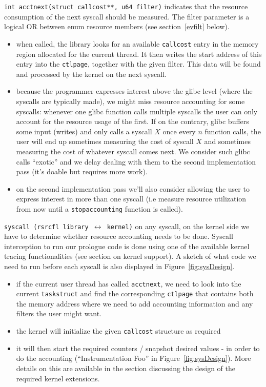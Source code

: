 \documentclass[12pt]{article}
\def\_{\textunderscore\-}
\begin{document}
{\color{blue}\texttt{int acct\_next(struct call\_cost**, u64 filter)}} indicates that the resource consumption of the next syscall should be measured. The filter parameter is a logical \textsc{OR} between enum resource members (see section~\ref{evfilt} below).
\begin{itemize}
\item when called, the library looks for an available \texttt{call\_cost} entry in the memory region allocated for the current thread. It then writes the start address of this entry into the \texttt{ctl\_page}, together with the given filter. This data will be found and processed by the kernel on the next syscall. 
\item because the programmer expresses interest above the glibc level (where the syscalls are typically made), we might miss resource accounting for some syscalls: whenever one glibc function calls multiple syscalls the user can only account for the resource usage of the first. If on the contrary, glibc buffers some input (writes) and only calls a syscall $X$ once every $n$ function calls, the user will end up sometimes measuring the cost of syscall $X$ and sometimes measuring the cost of whatever syscall comes next. We consider such glibc calls ``exotic'' and we delay dealing with them to the second implementation pass (it’s doable but requires more work).
\item on the second implementation pass we’ll also consider allowing the user to express interest in more than one syscall (i.e measure resource utilization from now until a \texttt{stop\_accounting} function is called). 
\end{itemize}

{\color{red}\texttt{syscall (rsrcfl library $\longleftrightarrow$ kernel)}} on any syscall, on the kernel side we have to determine whether resource accounting needs to be done. Syscall interception to run our prologue code is done using one of the available kernel tracing functionalities (see section on kernel support). A sketch of what code we need to run before each syscall is also displayed in Figure~\ref{fig:sysDesign}.
\begin{itemize}
\item if the current user thread has called \texttt{acct\_next}, we need to look into the current \texttt{task\_struct} and find the corresponding \texttt{ctl\_page} that contains both the memory address where we need to add accounting information and any filters the user might want.
\item the kernel will initialize the given \texttt{call\_cost} structure as required
\item it will then start the required counters / snapshot desired values - in order to do the accounting (“Instrumentation Foo” in Figure~\ref{fig:sysDesign}). More details on this are available in the section discussing the design of the required kernel extensions.
\end{itemize}
\end{document}
